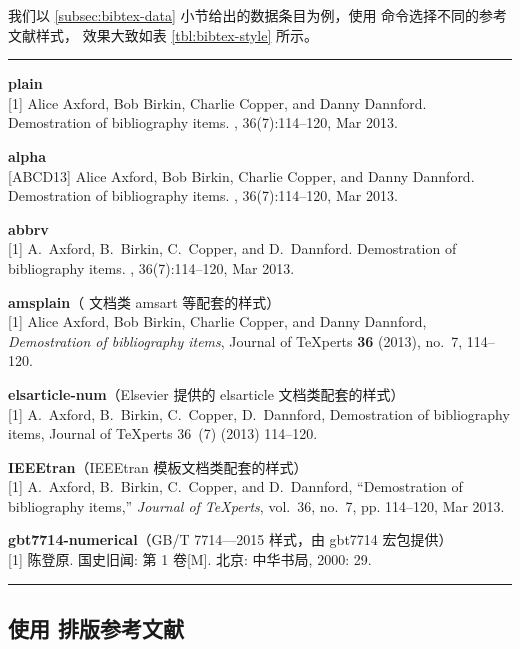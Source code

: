 我们以 \ref{subsec:bibtex-data} 小节给出的数据条目为例，使用  命令选择不同的参考文献样式，
效果大致如表 \ref{tbl:bibtex-style} 所示。

\begin{table}[htp]
\caption{ 样式的排版效果}\label{tbl:bibtex-style}
\hrule
\begin{trivlist}\item\relax
\textbf{plain}\\{}
[1] Alice Axford, Bob Birkin, Charlie Copper, and Danny Dannford.
\newblock Demostration of bibliography items.
, 36(7):114--120, Mar 2013.

\medskip
\textbf{alpha}\\{}
[ABCD13] Alice Axford, Bob Birkin, Charlie Copper, and Danny Dannford.
\newblock Demostration of bibliography items.
, 36(7):114--120, Mar 2013.

\medskip
\textbf{abbrv}\\{}
[1] A.~Axford, B.~Birkin, C.~Copper, and D.~Dannford.
\newblock Demostration of bibliography items.
, 36(7):114--120, Mar 2013.

\medskip
\textbf{amsplain}（\AmS{} 文档类 \textsf{amsart} 等配套的样式）\\{}
[1] Alice Axford, Bob Birkin, Charlie Copper, and Danny Dannford, \emph{Demostration of bibliography
  items}, Journal of \TeX perts \textbf{36} (2013), no.~7, 114--120.

\medskip
\textbf{elsarticle-num}（Elsevier 提供的 \textsf{elsarticle} 文档类配套的样式）\\{}
[1] A.~Axford, B.~Birkin, C.~Copper, D.~Dannford, Demostration of bibliography items,
  Journal of \TeX perts 36~(7) (2013) 114--120.

\medskip
\textbf{IEEEtran}（\textsf{IEEEtran} 模板文档类配套的样式）\\{}
[1] A.~Axford, B.~Birkin, C.~Copper, and D.~Dannford, ``Demostration of
  bibliography items,'' \emph{Journal of \TeX perts}, vol.~36, no.~7, pp.
  114--120, Mar 2013.

\medskip
\textbf{gbt7714-numerical}（GB/T 7714---2015 样式，由 \textsf{gbt7714} 宏包提供）\\{}
[1] 陈登原. 国史旧闻: 第 1 卷[M]. 北京: 中华书局, 2000: 29.
\end{trivlist}
\hrule
\end{table}

\subsection{使用  排版参考文献}\label{subsec:bibtex-use}

